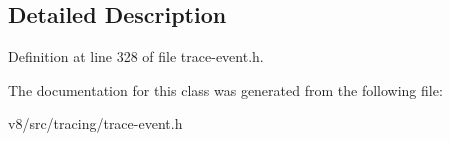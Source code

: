 \subsection{Detailed Description}


Definition at line 328 of file trace-\/event.\+h.



The documentation for this class was generated from the following file\+:\begin{DoxyCompactItemize}
\item 
v8/src/tracing/trace-\/event.\+h\end{DoxyCompactItemize}
